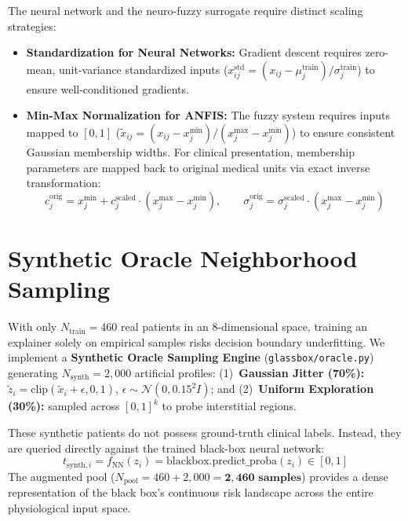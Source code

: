 \documentclass{report}
\begin{document}
The neural network and the neuro-fuzzy surrogate require distinct scaling strategies:
\begin{itemize}
    \setlength{\itemsep}{0pt}
    \setlength{\parskip}{0pt}
    \item \textbf{Standardization for Neural Networks:} Gradient descent requires zero-mean, unit-variance standardized inputs ($x_{ij}^{\text{std}} = (x_{ij} - \mu_j^{\text{train}}) / \sigma_j^{\text{train}}$) to ensure well-conditioned gradients.
    \item \textbf{Min-Max Normalization for ANFIS:} The fuzzy system requires inputs mapped to $[0, 1]$ ($\tilde{x}_{ij} = (x_{ij} - x_j^{\min}) / (x_j^{\max} - x_j^{\min})$) to ensure consistent Gaussian membership widths. For clinical presentation, membership parameters are mapped back to original medical units via exact inverse transformation:
    \begin{equation}
        c_j^{\text{orig}} = x_j^{\min} + c_j^{\text{scaled}} \cdot (x_j^{\max} - x_j^{\min}), \qquad \sigma_j^{\text{orig}} = \sigma_j^{\text{scaled}} \cdot (x_j^{\max} - x_j^{\min})
    \end{equation}
\end{itemize}

\section{Synthetic Oracle Neighborhood Sampling}

With only $N_{\text{train}} = 460$ real patients in an 8-dimensional space, training an explainer solely on empirical samples risks decision boundary underfitting. We implement a \textbf{Synthetic Oracle Sampling Engine} (\texttt{glassbox/oracle.py}) generating $N_{\text{synth}} = 2{,}000$ artificial profiles: (1)~\textbf{Gaussian Jitter (70\%):} $\tilde{z}_i = \text{clip}(\tilde{x}_i + \epsilon, 0, 1)$, $\epsilon \sim \mathcal{N}(0, 0.15^2 I)$; and (2)~\textbf{Uniform Exploration (30\%):} sampled across $[0, 1]^k$ to probe interstitial regions.

These synthetic patients do not possess ground-truth clinical labels. Instead, they are queried directly against the trained black-box neural network:
\begin{equation}
    t_{\text{synth}, i} = f_{\text{NN}}(z_i) = \text{blackbox.predict\_proba}(z_i) \in [0, 1]
\end{equation}
The augmented pool ($N_{\text{pool}} = 460 + 2{,}000 = \mathbf{2{,}460\text{ samples}}$) provides a dense representation of the black box's continuous risk landscape across the entire physiological input space.
\end{document}

